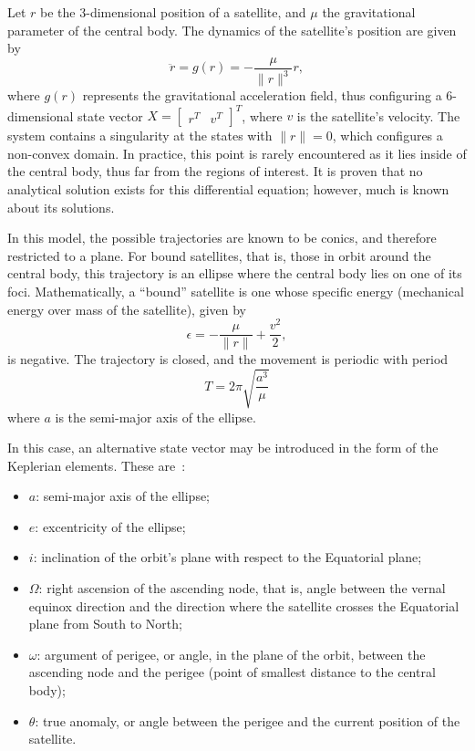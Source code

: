 Let \(r\) be the 3-dimensional position of a satellite, and \(\mu \) the gravitational parameter of the central body. The dynamics of the satellite's position are given by~\cite{curtis2015orbital}
\begin{equation} \label{eq:kepler_dyn}
    \ddot{r} = g(r) = -\frac{\mu}{\lVert r \rVert^3} r,
\end{equation}
where \(g(r)\) represents the gravitational acceleration field, thus configuring a 6-dimensional state vector \(X = \begin{bmatrix}
    r^T & v^T
\end{bmatrix}^T\), where \(v\) is the satellite's velocity. The system contains a singularity at the states with \(\lVert r \rVert = 0\), which configures a non-convex domain. In practice, this point is rarely encountered as it lies inside of the central body, thus far from the regions of interest. It is proven that no analytical solution exists for this differential equation; however, much is known about its solutions.

In this model, the possible trajectories are known to be conics, and therefore restricted to a plane. For bound satellites, that is, those in orbit around the central body, this trajectory is an ellipse where the central body lies on one of its foci. Mathematically, a ``bound'' satellite is one whose specific energy (mechanical energy over mass of the satellite), given by~\cite{curtis2015orbital}
\begin{equation}
    \epsilon = -\frac{\mu}{\lVert r \rVert} + \frac{v^2}{2},
\end{equation}
is negative. The trajectory is closed, and the movement is periodic with period~\cite{curtis2015orbital}
\begin{equation}
    T = 2\pi \sqrt{\frac{a^3}{\mu}}
\end{equation}
where \(a\) is the semi-major axis of the ellipse.

In this case, an alternative state vector may be introduced in the form of the Keplerian elements. These are~\cite{curtis2015orbital}:
\begin{itemize}
    \item \(a\): semi-major axis of the ellipse;
    \item \(e\): excentricity of the ellipse;
    \item \(i\): inclination of the orbit's plane with respect to the Equatorial plane;
    \item \(\Omega \): right ascension of the ascending node, that is, angle between the vernal equinox direction and the direction where the satellite crosses the Equatorial plane from South to North;
    \item \(\omega \): argument of perigee, or angle, in the plane of the orbit, between the ascending node and the perigee (point of smallest distance to the central body);
    \item \(\theta \): true anomaly, or angle between the perigee and the current position of the satellite.
\end{itemize}

